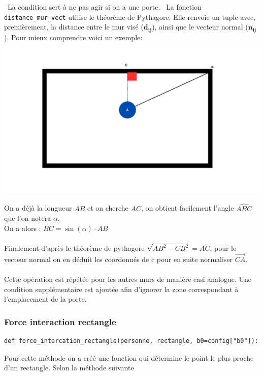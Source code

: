 \documentclass[a4paper,12pt]{article}
\begin{document}
\
La condition sert à ne pas agir si on a une porte.
\
La fonction \texttt{distance\_mur\_vect} utilise le théorème de Pythagore. Elle renvoie un tuple avec, premièrement, la distance entre le mur visé ($\mathbf{d_{ij}}$), ainsi que le vecteur normal ($\mathbf{n_{ij}}$). Pour mieux comprendre voici un exemple:

\includegraphics[width=\textwidth]{explication.png}

On a déjà la longueur \( AB \) et on cherche \( AC \), on obtient facilement l'angle \( \widehat{ABC} \) que l'on notera \( \alpha \). \\
On a alors : \( BC = \sin(\alpha) \cdot AB \)
\\
\\
Finalement d'après le théorème de pythagore $\sqrt{AB^2 - CB^2} = AC$, pour le vecteur normal on en déduit les coordonnés de c pour en suite normaliser $\vec{CA}$.
\\
\\
\indent Cette opération est répétée pour les autres murs de manière casi analogue. Une condition supplémentaire est ajoutée afin d’ignorer la zone correspondant à l’emplacement de la porte.

\subsubsection{Force interaction rectangle}

\begin{verbatim}
def force_intercation_rectangle(personne, rectangle, b0=config["b0"]):
\end{verbatim}

Pour cette méthode on a créé une fonction qui détermine le point le plus proche d'un rectangle. Selon la méthode suivante
\end{document}

